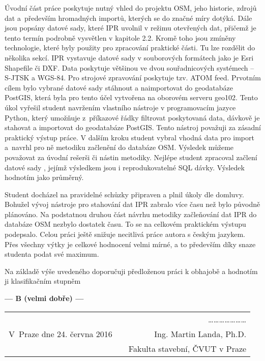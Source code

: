 \documentclass[czech,11pt,a4paper]{article}
\begin{document}
Úvodní část práce poskytuje nutný vhled do projektu OSM, jeho
historie, zdrojů dat a~především hromadných importů, kterých se do
značné míry dotýká. Dále jsou popsány datové sady, které IPR uvolnil v
režimu otevřených dat, přičemž je tento termín podrobně vysvětlen v
kapitole 2.2. Kromě toho jsou zmíněny technologie, které byly použity
pro zpracování praktické části. Tu lze rozdělit do několika sekcí. IPR
vystavuje datové sady v souborových formátech jako je Esri Shapefile
či DXF. Data poskytuje většinou ve dvou souřadni\-cových systémech --
S-JTSK a WGS-84. Pro strojové zpravování poskytuje tzv. ATOM
feed. Prvotním cílem bylo vybrané datové sady stáhnout a naimportovat
do geodatabáze PostGIS, která byla pro tento účel vytvořena na
oborovém serveru geo102. Tento úkol vyřešil student navržením
vlastního nástroje v programovacím jazyce Python, který umožňuje
z~příkazové řádky filtrovat poskytovaná data, dávkově je stahovat a
importovat do geodatabáze PostGIS. Tento nástroj považuji za zásadní
praktický výstup práce. V dalším kroku student vybral vhodná data pro
import a~navrhl pro ně metodiku začlenění do databáze OSM. Výsledek
můžeme považovat za úvodní rešerši či nástin metodiky. Nejlépe student
zpracoval začlení datové sady , jejímž výsledkem jsou i
reprodukovatelné SQL dávky. Výsledek hodnotím jako průměrný. \newline

Student docházel na pravidelné schůzky připraven a plnil úkoly dle
domluvy. Bohužel vývoj nástroje pro stahování dat IPR zabralo více
času než bylo původně plánováno. Na podstatnou druhou část návrhu
metodiky začleňování dat IPR do databáze OSM nezbylo dostatek
času. To se na celkovém praktickém výstupu podepsalo. Celou práci
ještě snižuje necitlivá práce autora s českým jazykem. Přes všechny
výtky je celkové hodnocení velmi mírné, a to především díky snaze
studenta podat své maximum. \newline

\newpage

Na základě výše uvedeného doporučuji předloženou práci k obhajobě a
hodnotím ji klasifikačním stupněm

\begin{center}
  {\bf --- B (velmi dobře) --- }
\end{center}

\vskip 2cm

\begin{tabular}{lp{}r}
& & \ldots\ldots\ldots\ldots\ldots\ldots\ldots \\
V~Praze dne 24. června 2016 & & Ing. Martin Landa, Ph.D. \\
& & Fakulta stavební, ČVUT v Praze \\
\end{tabular}
\end{document}
